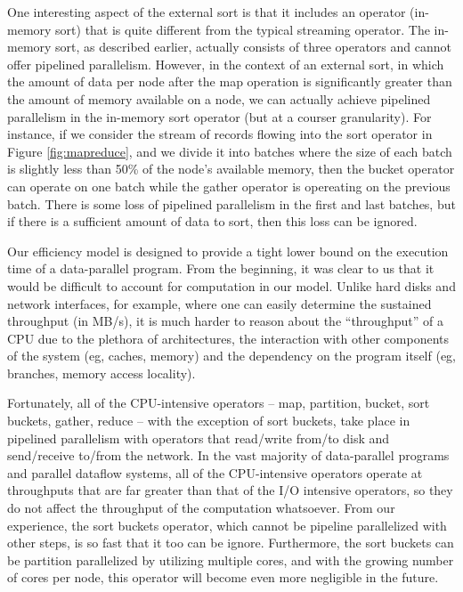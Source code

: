 \documentclass{acm_proc_article-sp}
\begin{document}
One interesting aspect of the external sort is that it includes an operator (in-memory sort) that is quite different from the typical streaming operator. The in-memory sort, as described earlier, actually consists of three operators and cannot offer pipelined parallelism. However, in the context of an external sort, in which the amount of data per node after the map operation is significantly greater than the amount of memory available on a node, we can actually achieve pipelined parallelism in the in-memory sort operator (but at a courser granularity). For instance, if we consider the stream of records flowing into the sort operator in Figure \ref{fig:mapreduce}, and we divide it into batches where the size of each batch is slightly less than 50\% of the node's available memory, then the bucket operator can operate on one batch while the gather operator is opereating on the previous batch. There is some loss of pipelined parallelism in the first and last batches, but if there is a sufficient amount of data to sort, then this loss can be ignored. 

Our efficiency model is designed to provide a tight lower bound on the execution time of a data-parallel program. From the beginning, it was clear to us that it would be difficult to account for computation in our model. Unlike hard disks and network interfaces, for example, where one can easily determine the sustained throughput (in MB/s), it is much harder to reason about the ``throughput'' of a CPU due to the plethora of architectures, the interaction with other components of the system (eg, caches, memory) and the dependency on the program itself (eg, branches, memory access locality).

Fortunately, all of the CPU-intensive operators -- map, partition, bucket, sort buckets, gather, reduce -- with the exception of sort buckets, take place in pipelined parallelism with operators that read/write from/to disk and send/receive to/from the network. In the vast majority of data-parallel programs and parallel dataflow systems, all of the CPU-intensive operators operate at throughputs that are far greater than that of the I/O intensive operators, so they do not affect the throughput of the computation whatsoever. From our experience, the sort buckets operator, which cannot be pipeline parallelized with other steps, is so fast that it too can be ignore. Furthermore, the sort buckets can be partition parallelized by utilizing multiple cores, and with the growing number of cores per node, this operator will become even more negligible in the future. 
\end{document}
